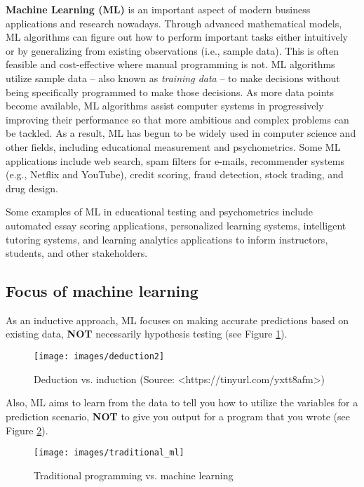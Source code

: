 \documentclass[
]{book}
\begin{document}
\textbf{Machine Learning (ML)} is an important aspect of modern business applications and research nowadays. Through advanced mathematical models, ML algorithms can figure out how to perform important tasks either intuitively or by generalizing from existing observations (i.e., sample data). This is often feasible and cost-effective where manual programming is not. ML algorithms utilize sample data -- also known as \emph{training data} -- to make decisions without being specifically programmed to make those decisions. As more data points become available, ML algorithms assist computer systems in progressively improving their performance so that more ambitious and complex problems can be tackled. As a result, ML has begun to be widely used in computer science and other fields, including educational measurement and psychometrics. Some ML applications include web search, spam filters for e-mails, recommender systems (e.g., Netflix and YouTube), credit scoring, fraud detection, stock trading, and drug design.

Some examples of ML in educational testing and psychometrics include automated essay scoring applications, personalized learning systems, intelligent tutoring systems, and learning analytics applications to inform instructors, students, and other stakeholders.

\hypertarget{focus-of-machine-learning}{%
\subsection{Focus of machine learning}\label{focus-of-machine-learning}}

As an inductive approach, ML focuses on making accurate predictions based on existing data, \textbf{NOT} necessarily hypothesis testing (see Figure \ref{fig:fig5-1}).

\begin{figure}
\texttt{[image: images/deduction2]} \caption{Deduction vs. induction (Source: <https://tinyurl.com/yxtt8afm>)}\label{fig:fig5-1}
\end{figure}

Also, ML aims to learn from the data to tell you how to utilize the variables for a prediction scenario, \textbf{NOT} to give you output for a program that you wrote (see Figure \ref{fig:fig5-2}).

\begin{figure}
\texttt{[image: images/traditional\_ml]} \caption{Traditional programming vs. machine learning}\label{fig:fig5-2}
\end{figure}
\end{document}
